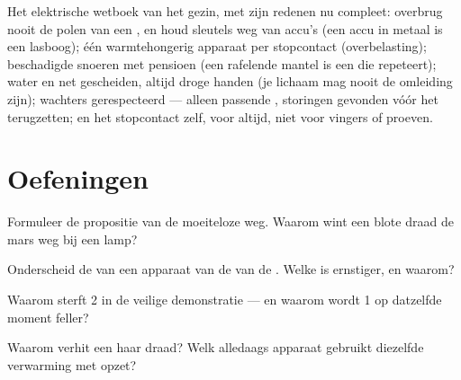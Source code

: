 \begin{remark}\label{rem:g7:short-circuits-safety:rules}
Het elektrische wetboek van het gezin, met zijn redenen nu compleet:
overbrug nooit de polen van een , en houd sleutels weg
van accu's (een  accu in metaal is een lasboog); één
warmtehongerig apparaat per stopcontact (overbelasting); beschadigde
snoeren met pensioen (een rafelende mantel is een  die
repeteert); water en net gescheiden, altijd droge handen (je lichaam
mag nooit de omleiding zijn); wachters gerespecteerd --- alleen
passende , storingen gevonden vóór het terugzetten; en het
stopcontact zelf, voor altijd, niet voor vingers of proeven.
\end{remark}

\section{Oefeningen}

\begin{exercise}[$\star$]\label{exo:g7:short-circuits-safety:1}
Formuleer de propositie van de moeiteloze weg. Waarom wint een blote
draad de mars weg bij een lamp?
\end{exercise}

\begin{exercise}[$\star$]\label{exo:g7:short-circuits-safety:2}
Onderscheid de  van een apparaat van de
 van de . Welke is ernstiger, en waarom?
\end{exercise}

\begin{exercise}[$\star$]\label{exo:g7:short-circuits-safety:3}
Waarom sterft  2 in de veilige demonstratie --- en waarom wordt
 1 op datzelfde moment feller?
\end{exercise}

\begin{exercise}[$\star$]\label{exo:g7:short-circuits-safety:4}
Waarom verhit een  haar draad? Welk alledaags apparaat
gebruikt diezelfde verwarming met opzet?
\end{exercise}

